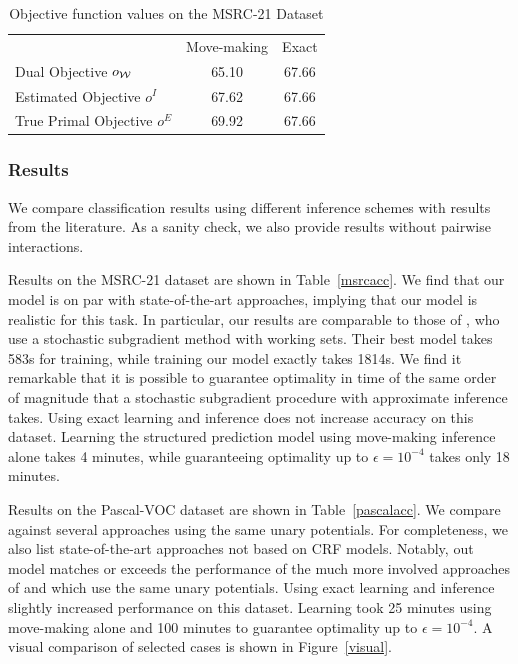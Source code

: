 \begin{table}
    \begin{center}
    \begin{tabularx}{\linewidth}{@{\extracolsep{\fill}}lcc}
    \toprule
                    & Move-making & Exact \\
    \cmidrule{1-3}
    Dual Objective $o_{\mathcal{W}}$ & 65.10 & 67.66  \\
    Estimated Objective $o^I$ &  67.62& 67.66\\
    True Primal Objective $o^E$& 69.92& 67.66\\
    \bottomrule
    \end{tabularx}
    \end{center}
    \caption{Objective function values on the MSRC-21 Dataset}
    \label{msrc_objective}
\end{table}

\subsubsection{Results}
We compare classification results using different inference schemes with
results from the literature. As a sanity check, we also provide results without
pairwise interactions.

Results on the MSRC-21 dataset are shown in Table~\ref{msrcacc}.
We find that our model is on par with state-of-the-art approaches, implying
that our model is realistic for this task. In particular, our results are comparable to those of
\citet{lucchi2013learning}, who use a stochastic subgradient method with working sets.
Their best model takes 583s for training, while training our model exactly takes 1814s.
We find it remarkable that it is possible to guarantee optimality in time of
the same order of magnitude that a stochastic subgradient procedure with
approximate inference takes. Using exact learning and inference does not increase accuracy
on this dataset.
Learning the structured prediction model using move-making inference alone
takes 4 minutes, while guaranteeing optimality up to  $\epsilon=10^{-4}$
takes only 18 minutes.

Results on the Pascal-VOC dataset are shown in Table~\ref{pascalacc}.
We compare against several approaches using the same unary potentials.
For completeness, we also list state-of-the-art approaches not based on CRF models.
Notably, out model matches or exceeds the performance of the much more involved approaches of
\citet{krahenbuhl2012efficient} and \citet{dann2012pottics} which use the same
unary potentials.
Using exact learning and inference slightly increased performance on this dataset.
Learning took 25 minutes using move-making alone and 100 minutes to guarantee optimality
up to $\epsilon=10^{-4}$.
A visual comparison of selected cases is shown in Figure~\ref{visual}.


